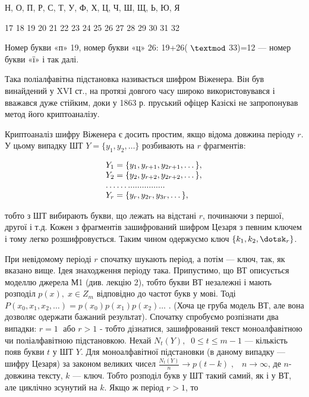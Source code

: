  Н,   О,   П,   Р,   С,  Т,   У,   Ф,   Х,   Ц,  Ч,   Ш,  Щ,  Ь,   Ю,   Я

  17   18   19  20  21  22   23   24   25  26  27   28  29  30  31  32


\bigskip

 Номер букви «п» 19, номер букви «ц» 26:  19+26( $\textmod$ 33)=12 --- номер
букви «ї» і так далі.

Така поліалфавітна  підстановка називається шифром Віженера. Він був винайдений
у XVI\textit{ }ст., на протязі довгого часу широко використовувався і вважався
дуже стійким, доки у 1863 р. пруський офіцер Казіскі не запропонував метод його
криптоаналізу. 

Криптоаналіз шифру Віженера є досить простим, якщо відома довжина періоду 
$r$. У цьому випадку ШТ  $Y=\{y_{1},y_2,\dots\}$
розбивають на  $r$ фрагментів:

\begin{equation*}
\begin{matrix}{Y_{1}=\{y_{1},y_{r+1},y_{2r+1},\dots\},}\hfill\null
\\Y_{2}=\{y_{2},y_{r+2},y_{2r+2},\dots\},\hfill\null
\\\dots\dots\text{.}\text{.}\text{.}\text{.}\text{.}\text{.}\text{.}\text{.}\text{.}\text{.}\text{.}\text{.}\text{.}\text{.}\text{.}\text{.}\hfill\null
\\Y_{r}=\{y_{r},y_{2r},y_{3r},\dots\},\hfill\null
\end{matrix}\hfill 
\end{equation*}

\bigskip

тобто з ШТ вибирають букви, що лежать на відстані  $r$, починаючи з першої,
другої і т.д. Кожен з фрагментів зашифрований шифром Цезаря з певним ключем і
тому легко розшифровується. Таким чином одержуємо ключ 
$\{k_{1},k_{2},\dotsk_r\}$. 

При невідомому періоді  $r$ спочатку шукають період, а потім --- ключ, так, як
вказано вище. Ідея знаходження періоду така. Припустимо, що ВТ описується
моделлю джерела  М1 (див. лекцію 2), тобто букви ВТ незалежні і мають розподіл 
$p(x),\;x\in Z_m$ відповідно до частот букв у мові. Тоді 
$P(x_{0},x_{1},x_{2},\dots)=p(x_{0})p(x_{1})p(x_2)\dots$
. (Хоча це груба модель ВТ, але вона дозволяє одержати бажаний результат).
Спочатку спробуємо розпізнати два випадки:  $r=1\;$ або  $r>1$ - тобто
дізнатися, зашифрований текст моноалфавітною чи поліалфавітною підстановкою.
Нехай  $N_t(Y),\;\;0\le t\le m-1$ --- кількість появ букви  $t$ у ШТ 
$Y$. Для моноалфавітної підстановки (в даному випадку --- шифру Цезаря) за
законом великих чисел  ${\frac{N_{t}(Y)}{n}\rightarrow
p(t-k)\;,\;\;\;n\rightarrow \infty }$, де  $n$- довжина тексту,  $k$ ---
ключ. Тобто розподіл букв у ШТ такий самий, як і у ВТ, але циклічно зсунутий на
 $k$. Якщо ж період  $r>1$, то 

